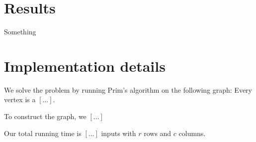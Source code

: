 


	\maketitle
	
	\section{Results}
	
Something


	
	\section{Implementation details}
	
	We solve the problem by running Prim's algorithm
	on the following graph:
	Every vertex is a $[\ldots]$.
	
	To construct the graph, we $[\ldots]$
	
	Our total running time is $[\ldots]$ inputs with $r$ rows and $c$ columns.
	
